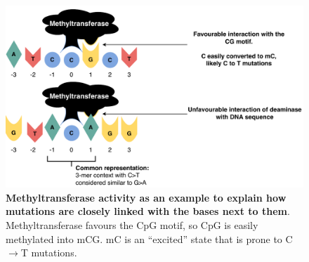 \begin{figure}[h!]
    \centering
    \includegraphics[scale=0.78]{graphics/motif_demo.pdf}
    \caption{\textbf{Methyltransferase activity as an example to explain how mutations are closely linked with the bases next to them}. Methyltransferase favours the CpG motif, so CpG is easily methylated into mCG. mC is an ``excited'' state that is prone to C$\rightarrow$T mutations.}
    \label{fig:motif_demo}
\end{figure}
